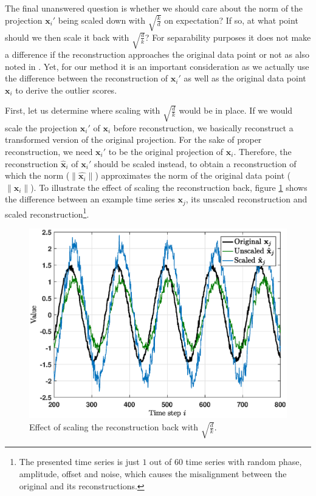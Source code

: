 The final unanswered question is whether we should care about the norm of the projection $\mathbf{x}_i'$ being scaled down with $\sqrt{\frac{k}{d}}$ on expectation? If so, at what point should we then scale it back with $\sqrt{\frac{d}{k}}$?
For separability purposes it does not make a difference if the reconstruction approaches the original data point or not as also noted in \cite{fradkin2003experiments}. Yet, for our method it is an important consideration as we actually use the difference between the reconstruction of $\mathbf{x}_i'$ as well as the original data point $\mathbf{x}_i$ to derive the outlier scores.

First, let us determine where scaling with $\sqrt{\frac{d}{k}}$ would be in place. If we would scale the projection $\mathbf{x}_i'$ of $\mathbf{x}_i$ before reconstruction, we basically reconstruct a transformed version of the original projection. For the sake of proper reconstruction, we need $\mathbf{x}_i'$ to be the original projection of $\mathbf{x}_i$. Therefore, the reconstruction $\hat{\mathbf{x}}_i$ of $\mathbf{x}_i'$ should be scaled instead, to obtain a reconstruction of which the norm ($\|\hat{\mathbf{x}_i}\|$) approximates the norm of the original data point ($\|\mathbf{x}_i\|$). To illustrate the effect of scaling the reconstruction back, figure \ref{fig:effect_backscaling} shows the difference between an example time series $\mathbf{x}_j$, its unscaled reconstruction and scaled reconstruction\footnote{The presented time series is just $1$ out of $60$ time series with random phase, amplitude, offset and noise, which causes the misalignment between the original and its reconstructions.}.

\begin{figure}[h]
	{\centering
		\vspace{-0.32cm}
		\includegraphics[scale=0.38]{rp-method/Effect_reconstruction_backscaling1}
		\vspace{-0.3cm}
		\caption{Effect of scaling the reconstruction back with $\sqrt{\frac{d}{k}}$.}
		\label{fig:effect_backscaling}}
		\vspace{-0.2cm}
\end{figure}

